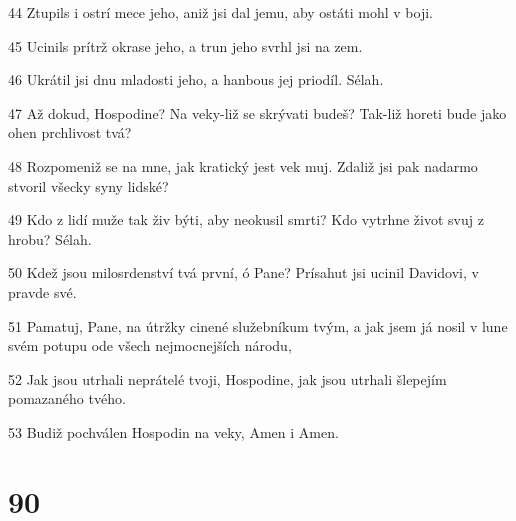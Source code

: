 \par 44 Ztupils i ostrí mece jeho, aniž jsi dal jemu, aby ostáti mohl v boji.
\par 45 Ucinils prítrž okrase jeho, a trun jeho svrhl jsi na zem.
\par 46 Ukrátil jsi dnu mladosti jeho, a hanbous jej priodíl. Sélah.
\par 47 Až dokud, Hospodine? Na veky-liž se skrývati budeš? Tak-liž horeti bude jako ohen prchlivost tvá?
\par 48 Rozpomeniž se na mne, jak kratický jest vek muj. Zdaliž jsi pak nadarmo stvoril všecky syny lidské?
\par 49 Kdo z lidí muže tak živ býti, aby neokusil smrti? Kdo vytrhne život svuj z hrobu? Sélah.
\par 50 Kdež jsou milosrdenství tvá první, ó Pane? Prísahut jsi ucinil Davidovi, v pravde své.
\par 51 Pamatuj, Pane, na útržky cinené služebníkum tvým, a jak jsem já nosil v lune svém potupu ode všech nejmocnejších národu,
\par 52 Jak jsou utrhali neprátelé tvoji, Hospodine, jak jsou utrhali šlepejím pomazaného tvého.
\par 53 Budiž pochválen Hospodin na veky, Amen i Amen.

\chapter{90}

